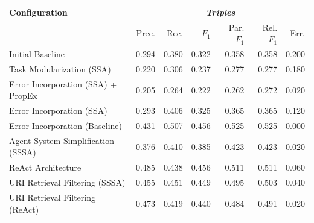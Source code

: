 \documentclass[a4paper,oneside,bibliography=totoc]{scrbook}
\begin{document}
\begin{table}[h]
  \centering
  \begin{tabular}{p{5cm}|rrrrrr}
    \toprule
    \textbf{Configuration}                       & \multicolumn{6}{c}{\textit{\textbf{Triples}}}                                                                                      \\
                                                 & Prec.                                         & Rec.           & $F_1$          & Par. $F_1$     & Rel. $F_1$     & Err.           \\
    \midrule
    Initial Baseline                             & 0.294                                         & 0.380          & 0.322          & 0.358          & 0.358          & 0.200          \\
    Task Modularization (\ac{SSA})               & 0.220                                         & 0.306          & 0.237          & 0.277          & 0.277          & 0.180          \\
    Error Incorporation (\ac{SSA}) + \ac{PropEx} & 0.205                                         & 0.264          & 0.222          & 0.262          & 0.272          & 0.020          \\
    Error Incorporation (\ac{SSA})               & 0.293                                         & 0.406          & 0.325          & 0.365          & 0.365          & 0.120          \\
    Error Incorporation (Baseline)               & 0.431                                         & 0.507          & 0.456          & 0.525          & 0.525          & 0.000          \\
    Agent System Simplification (\ac{SSSA})      & 0.376                                         & 0.410          & 0.385          & 0.423          & 0.423          & 0.020          \\
    \ac{ReAct} Architecture                      & 0.485                                         & 0.438          & 0.456          & 0.511          & 0.511          & 0.060          \\
    \ac{URI} Retrieval Filtering (\ac{SSSA})     & 0.455                                         & 0.451          & 0.449          & 0.495          & 0.503          & 0.040          \\
    \ac{URI} Retrieval Filtering (\ac{ReAct})    & 0.473                                         & 0.419          & 0.440          & 0.484          & 0.491          & 0.020          \\

\end{tabular}
\end{table}
\end{document}
